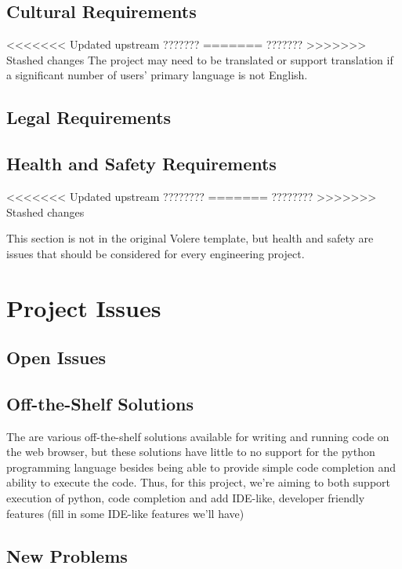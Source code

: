 \documentclass[12pt, titlepage]{article}
\begin{document}
  \subsection{Cultural Requirements}
<<<<<<< Updated upstream
  {\huge ???????}
=======
  \Huge ???????
>>>>>>> Stashed changes
  The project may need to be translated or support translation if a significant
  number of users' primary language is not English.

  \subsection{Legal Requirements}

  \subsection{Health and Safety Requirements}
<<<<<<< Updated upstream
  {\huge ????????}
=======
  \Huge ????????
>>>>>>> Stashed changes

  This section is not in the original Volere template, but health and safety are
  issues that should be considered for every engineering project.

\section{Project Issues}

  \subsection{Open Issues}

  \subsection{Off-the-Shelf Solutions}
  The are various off-the-shelf solutions available for writing and running
  code on the web browser, but these solutions have little to no support for
  the python programming language besides being able to provide simple code
  completion and ability to execute the code. Thus, for this project, we're
  aiming to both support execution of python, code completion and add IDE-like,
  developer friendly features ({\Huge fill in some IDE-like features we'll
  have})

  \subsection{New Problems}
\end{document}
